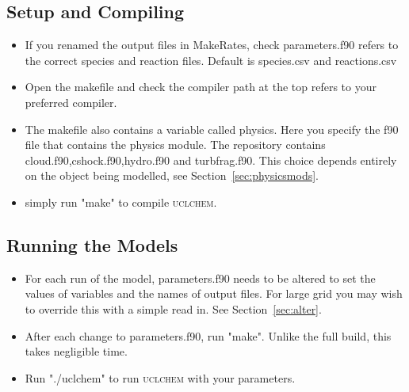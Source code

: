 \documentclass{llncs}
\begin{document}
\subsection{Setup and Compiling}
\begin{itemize}
\item If you renamed the output files in MakeRates, check parameters.f90 refers to the correct species and reaction files. Default is species.csv and reactions.csv
\item Open the makefile and check the compiler path at the top refers to your preferred compiler.
\item The makefile also contains a variable called physics. Here you specify the f90 file that contains the physics module. The repository contains cloud.f90,cshock.f90,hydro.f90 and turbfrag.f90. This choice depends entirely on the object being modelled, see Section~\ref{sec:physicsmods}.
\item simply run "make" to compile \textsc{uclchem}.
\end{itemize}
%
\subsection{Running the Models}
\begin{itemize}
\item For each run of the model, parameters.f90 needs to be altered to set the values of variables and the names of output files. For large grid you may wish to override this with a simple read in. See Section~\ref{sec:alter}.
\item After each change to parameters.f90, run "make". Unlike the full build, this takes negligible time.
\item Run "./uclchem" to run \textsc{uclchem} with your parameters.
\end{itemize}
%
%
\end{document}
